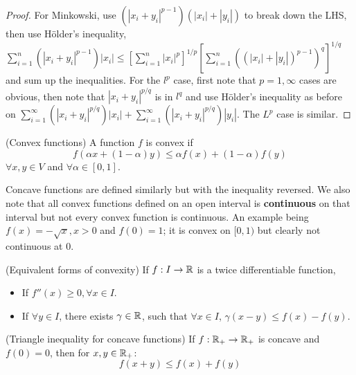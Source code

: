 \documentclass{article}
\begin{document}
\begin{cor}
\begin{proof}
        For Minkowski, use $(|x_i+y_i|^{p-1})(|x_i|+|y_i|)$ to break down the LHS, then use Hölder's inequality,
        $\sum_{i=1}^n (|x_i+y_i|^{p-1})|x_i| \leq \left[ \sum_{i=1}^n |x_i|^p\right]^{1/p}
        \left[ \sum_{i=1}^n ((|x_i|+|y_i|)^{p-1})^q\right]^{1/q}$ and sum up the inequalities.   
        For the $l^p$ case, first note that $p=1,\infty$ cases are obvious, then note
        that $|x_i+y_i|^{p/q}$ is in $l^q$ and use Hölder's inequality as before on 
        $\sum_{i=1}^{\infty} (|x_i+y_i|^{p/q})|x_i|+\sum_{i=1}^{\infty} (|x_i+y_i|^{p/q})|y_i|$.  
        The $L^p$ case is similar.  
    \end{proof}
\end{cor}

\begin{defn}
    (Convex functions) A function $f$ is convex if 
    \begin{equation*}
        f(\alpha x + (1-\alpha)y) \leq \alpha f(x) + (1-\alpha)f(y)
    \end{equation*}
    $\forall x,y \in V$ and $\forall \alpha \in [0,1]$.
\end{defn}

Concave functions are defined similarly but with the inequality reversed. We also note that all convex functions defined
on an open interval is \textbf{continuous} on that interval but not every convex function is continuous. An example being
$f(x) = - \sqrt{x}, x>0$ and $f(0)=1$; it is convex on $[0,1)$ but clearly not continuous at $0$.

\begin{prop}
    (Equivalent forms of convexity) If $f: I \to \mathbb{R}$ is a twice differentiable function,  
    \begin{itemize}
        \item If $f''(x)\geq 0, \forall x \in I$.
        \item If $\forall y \in I$, there exists $\gamma \in \mathbb{R}$, such that $\forall x \in I$, 
                $\gamma (x-y) \leq f(x)-f(y)$.
    \end{itemize}
\end{prop}


\begin{prop}
    (Triangle inequality for concave functions)  
    If $f: \mathbb{R}_+ \to \mathbb{R}_+$ is concave and $f(0)=0$, then for $x,y \in \mathbb{R}_+$:
    \begin{equation*}
        f(x+y) \leq f(x) + f(y)
    \end{equation*}
\end{prop}
\end{document}

